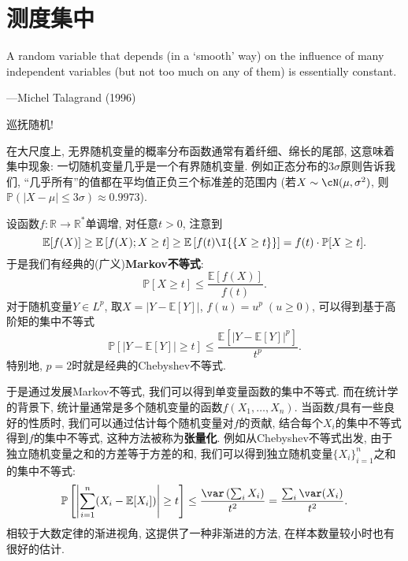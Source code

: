 \section{测度集中}

\epigraph{A random variable that depends (in a ‘smooth’ way) on the influence of many independent variables (but not too much on any of them) is essentially constant.}{---Michel Talagrand (1996)} 

巡抚随机!

在大尺度上, 无界随机变量的概率分布函数通常有着纤细、绵长的尾部, 这意味着集中现象: 一切随机变量几乎是一个有界随机变量.  
例如正态分布的$3 \sigma$原则告诉我们, “几乎所有”的值都在平均值正负三个标准差的范围内 (若$X \sim \cN(\mu, \sigma^2)$, 则$\mathbb{P}(|X - \mu| \leq 3 \sigma) \approx 0.9973$). 

设函数$f \colon \mathbb{R} \to \mathbb{R}^*$单调增, 对任意$t > 0$, 注意到
\begin{equation*}
	\mathbb{E}[f(X)] 
		\geq \mathbb{E}\left[f(X); X \geq t \right]
		\geq \mathbb{E}\left[f(t) \I{\{X \geq t\}} \right] 
		= f(t) \cdot \mathbb{P}[X \geq t].
\end{equation*}
于是我们有经典的(广义)\textbf{Markov不等式}: 
\begin{equation}\label{eq:Markov'sInequality}
	\mathbb{P}[X \geq t] \leq \frac{\mathbb{E}[f(X)]}{f(t)}.
\end{equation}
对于随机变量$Y \in L^p$, 取$X = |Y - \mathbb{E}[Y]|$, $f(u) = u^p\; (u \geq 0)$, 可以得到基于高阶矩的集中不等式
\begin{equation*}
	\mathbb{P}[|Y - \mathbb{E}[Y]| \geq t] \leq \frac{ \mathbb{E}[ |Y - \mathbb{E}[Y]|^p]}{t^p}. 
\end{equation*} 
特别地, $p=2$时就是经典的Chebyshev不等式. 

于是通过发展Markov不等式, 我们可以得到单变量函数的集中不等式. 
而在统计学的背景下, 统计量通常是多个随机变量的函数$f(X_1, \dots, X_n)$. 
当函数$f$具有一些良好的性质时, 我们可以通过估计每个随机变量对$f$的贡献, 结合每个$X_i$的集中不等式得到$f$的集中不等式, 这种方法被称为\textbf{张量化}. 
例如从Chebyshev不等式出发, 由于独立随机变量之和的方差等于方差的和, 我们可以得到独立随机变量$\{X_i\}_{i=1}^n$之和的集中不等式:  
\begin{equation*}
	\mathbb{P} \left[ \left|\sum_{i=1}^n (X_i - \mathbb{E}[X_i]) \right| \geq t \right]
	\leq \frac{\var\left(\sum_i  X_i\right)}{t^2}
	= \frac{\sum_i \var(X_i)}{t^2}. 
\end{equation*}
相较于大数定律的渐进视角, 这提供了一种非渐进的方法, 在样本数量较小时也有很好的估计. 

